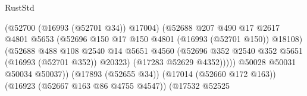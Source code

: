 \begin{lexlean}{RustStd}
\begin{coremodule}
                                                        (@52700 (@16993 (@52701 @34)) @17004)
                                                        (@52688
                                                          @207
                                                          @490
                                                          @17
                                                          @2617
                                                          @4801
                                                          @5653
                                                          (@52696
                                                            @150
                                                            @17
                                                            @150
                                                            @4801
                                                            (@16993 (@52701 @150))
                                                            @18108)
                                                          (@52688
                                                            @488
                                                            @108
                                                            @2540
                                                            @14
                                                            @5651
                                                            @4560
                                                            (@52696
                                                              @352
                                                              @2540
                                                              @352
                                                              @5651
                                                              (@16993 (@52701 @352))
                                                              @20323)
                                                            (@17283 @52629 @4352)))))
                                                    @50028
                                                    @50031
                                                    @50034
                                                    @50037))
                                                (@17893 (@52655 @34))
                                                (@17014 (@52660 @172 @163))
                                                (@16923 (@52667 @163 @86 @4755 @4547))
                                                (@17532
                                                  @52525

\end{coremodule}
\end{lexlean}
